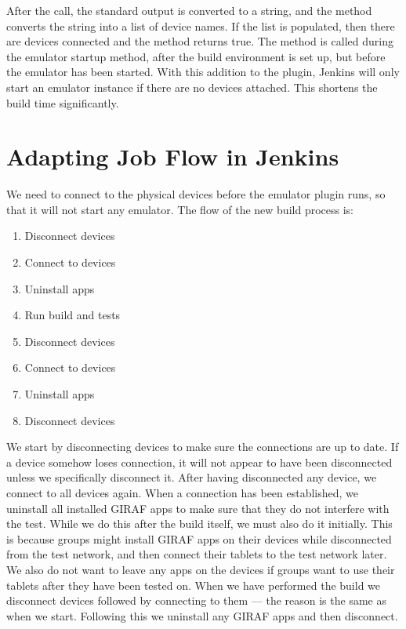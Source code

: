After the call, the standard output is converted to a string, and the method  converts the string into a list of device names. If the list is populated, then there are devices connected and the method returns true. The method  is called during the emulator startup method, after the build environment is set up, but before the emulator has been started. With this addition to the plugin, Jenkins will only start an emulator instance if there are no devices attached. This shortens the build time significantly.

\section{Adapting Job Flow in Jenkins}\label{sec:adapting_job_flow}
We need to connect to the physical devices before the emulator plugin runs, so that it will not start any emulator. The flow of the new build process is:

\begin{multicols}{2}
\begin{enumerate}
  \item Disconnect devices
  \item Connect to devices
  \item Uninstall apps
  \item Run build and tests
  \item Disconnect devices
  \item Connect to devices
  \item Uninstall apps
  \item Disconnect devices
\end{enumerate}
\end{multicols}

We start by disconnecting devices to make sure the connections are up to date. If a device somehow loses connection, it will not appear to have been disconnected unless we specifically disconnect it. After having disconnected any device, we connect to all devices again. When a connection has been established, we uninstall all installed GIRAF apps to make sure that they do not interfere with the test. While we do this after the build itself, we must also do it initially. This is because groups might install GIRAF apps on their devices while disconnected from the test network, and then connect their tablets to the test network later. We also do not want to leave any apps on the devices if groups want to use their tablets after they have been tested on. When we have performed the build we disconnect devices followed by connecting to them --- the reason is the same as when we start. Following this we uninstall any GIRAF apps and then disconnect.

